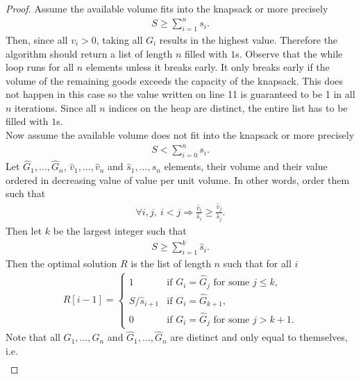 \documentclass{article}
\begin{document}
\begin{proof}
    Assume the available volume fits into the knapsack or more precisely
    \begin{align*}
        S \geq \sum_{i=1}^n s_i.
    \end{align*}
    Then, since all $v_i>0$, taking all $G_i$ results in the highest value.
    Therefore the algorithm should return a list of length $n$ filled with
    $1$s. Observe that the while loop runs for all $n$ elements unless it
    breaks early. It only breaks early if the volume of the remaining goods
    exceeds the capacity of the knapsack. This does not happen in this case
    so the value written on line 11 is guaranteed to be 1 in all $n$ 
    iterations. Since all $n$ indices on the heap are distinct, the entire
    list has to be filled with $1$s.\\
    Now assume the available volume does not fit into the knapsack or more
    precisely
    \begin{align*}
        S < \sum_{i=0}^n s_i.
    \end{align*}
    Let $\hat G_1, ...,\hat G_n$, $\hat v_1, ...,\hat v_n$ and $\hat s_1, ...,\hat s_n$ 
    elements, their volume and their value ordered in decreasing value of value per unit
    volume. In other words, order them such that
    \begin{align}
        \label{iord}
        \forall i,j,\: i < j \Rightarrow \frac{\hat v_i}{\hat s_i}\geq \frac{\hat v_j}{\hat s_j}. 
    \end{align}
    Then let $k$ be the largest integer such that
    \begin{align*}
        S \geq \sum_{i=1}^k \hat s_i.
    \end{align*}
    Then the optimal solution $R$ is the list of length $n$ such that for all $i$
    \begin{align}
        \label{optsol}
        R[i-1] = \begin{cases}
            1              &\text{if } G_i = \hat G_j \text{ for some } j \leq k,\\
            S/\hat s_{i+1} &\text{if } G_i = \hat G_{k+1},\\
            0              &\text{if } G_i = \hat G_j \text{ for some } j > k+1.
        \end{cases}
    \end{align}
    Note that all $G_1, ..., G_n$ and $\hat G_1, ..., \hat G_n$ are distinct
    and only equal to themselves, i.e.
    \begin{align*}

\end{align*}
\end{proof}
\end{document}
